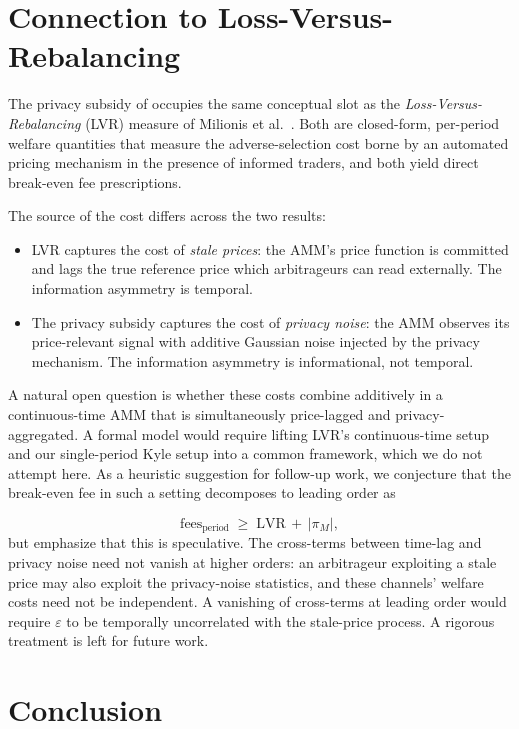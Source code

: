 \documentclass[runningheads]{llncs}
\begin{document}
\section{Connection to Loss-Versus-Rebalancing}
\label{sec:lvr}

The privacy subsidy of  occupies the same
conceptual slot as the \emph{Loss-Versus-Rebalancing} (LVR) measure
of Milionis et al.~\cite{milionis2022lvr}. Both are closed-form,
per-period welfare quantities that measure the adverse-selection
cost borne by an automated pricing mechanism in the presence of
informed traders, and both yield direct break-even fee
prescriptions.

The source of the cost differs across the two results:
\begin{itemize}[leftmargin=*]
\item LVR captures the cost of \emph{stale prices}: the AMM's
price function is committed and lags the true reference price
which arbitrageurs can read externally. The information asymmetry
is temporal.
\item The privacy subsidy captures the cost of \emph{privacy
noise}: the AMM observes its price-relevant signal with additive
Gaussian noise injected by the privacy mechanism. The
information asymmetry is informational, not temporal.
\end{itemize}

\begin{sloppypar}
A natural open question is whether these costs combine additively
in a continuous-time AMM that is simultaneously price-lagged and
privacy-aggregated. A formal model would require lifting LVR's
continuous-time setup and our single-period Kyle setup into a
common framework, which we do not attempt here. As a heuristic
suggestion for follow-up work, we conjecture that the
break-even fee in such a setting decomposes to leading order as
\end{sloppypar}
\[
\mathrm{fees}_{\text{period}} \;\geq\; \mathrm{LVR}
   \,+\, |\pi_M|,
\]
but emphasize that this is speculative. The cross-terms between
time-lag and privacy noise need not vanish at higher orders: an
arbitrageur exploiting a stale price may also exploit the
privacy-noise statistics, and these channels' welfare costs need
not be independent. A vanishing of cross-terms at leading order
would require $\varepsilon$ to be temporally uncorrelated with the
stale-price process. A rigorous treatment is left for future work.

\section{Conclusion}
\label{sec:conclusion}
\end{document}
